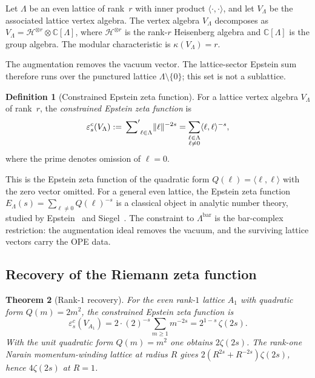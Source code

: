 \documentclass[11pt,reqno]{amsart}
\newtheorem{theorem}{Theorem}[section]
\theoremstyle{definition}
\newtheorem{definition}[theorem]{Definition}
\theoremstyle{remark}
\providecommand{\cH}{\mathcal{H}}
\providecommand{\bC}{\mathbb{C}}
\numberwithin{equation}{section}
\begin{document}
Let $\Lambda$ be an even lattice of rank~$r$ with inner product
$\langle\cdot,\cdot\rangle$, and let $V_\Lambda$ be the associated
lattice vertex algebra. The vertex algebra $V_\Lambda$ decomposes as
$V_\Lambda = \cH^{\otimes r} \otimes \bC[\Lambda]$, where
$\cH^{\otimes r}$ is the rank-$r$ Heisenberg algebra and
$\bC[\Lambda]$ is the group algebra. The modular characteristic is
$\kappa(V_\Lambda) = r$.

The augmentation removes the vacuum vector. The lattice-sector
Epstein sum therefore runs over the punctured lattice
$\Lambda\setminus\{0\}$; this set is not a sublattice.

\begin{definition}[Constrained Epstein zeta function]
  \label{def:constrained-epstein}
  For a lattice vertex algebra $V_\Lambda$ of rank~$r$, the
  \emph{constrained Epstein zeta function} is
  \begin{equation}\label{eq:constrained-epstein}
    \varepsilon^c_s(V_\Lambda)
    :=
    {\sideset{}{'}\sum}_{\ell \in \Lambda}
    \|\ell\|^{-2s}
    = \sum_{\substack{\ell \in \Lambda \\ \ell \ne 0}}
    \langle \ell, \ell \rangle^{-s},
  \end{equation}
  where the prime denotes omission of $\ell = 0$.
\end{definition}

This is the Epstein zeta function of the quadratic form
$Q(\ell) = \langle \ell, \ell \rangle$ with the zero vector omitted.
For a general even lattice, the Epstein zeta function
$E_\Lambda(s) = \sum_{\ell \ne 0} Q(\ell)^{-s}$ is a classical
object in analytic number theory, studied by Epstein~\cite{Epstein03,
Epstein07} and Siegel~\cite{Siegel51}. The constraint to
$\Lambda^{\mathrm{bar}}$ is the bar-complex restriction: the
augmentation ideal removes the vacuum, and the surviving lattice
vectors carry the OPE data.

\subsection{Recovery of the Riemann zeta function}

\begin{theorem}[Rank-$1$ recovery]\label{thm:rank1-recovery}
  For the even rank-$1$ lattice $A_1$ with quadratic form
  $Q(m)=2m^2$, the constrained Epstein zeta function is
  \begin{equation}\label{eq:rank1-epstein}
    \varepsilon^c_s(V_{A_1})
    = 2 \cdot (2)^{-s} \sum_{m \ge 1} m^{-2s}
    = 2^{1-s}\,\zeta(2s).
  \end{equation}
  With the unit quadratic form $Q(m)=m^2$ one obtains
  $2\zeta(2s)$. The rank-one Narain momentum-winding lattice at
  radius $R$ gives
  $2(R^{2s}+R^{-2s})\zeta(2s)$, hence $4\zeta(2s)$ at $R=1$.
\end{theorem}
\end{document}
